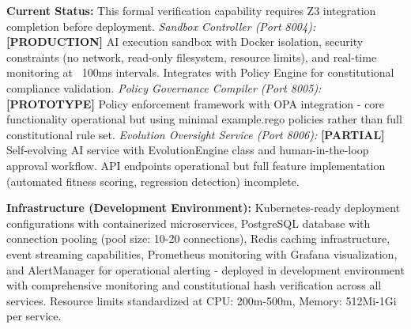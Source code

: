 \documentclass[manuscript,screen,9pt]{acmart}
\begin{document}
\begin{figure*}[!htb]
{\textbf{Current Status:} This formal verification capability requires Z3 integration completion before deployment.
\textit{Sandbox Controller (Port 8004):} \textbf{[PRODUCTION]} AI execution sandbox with Docker isolation, security constraints (no network, read-only filesystem, resource limits), and real-time monitoring at ~100ms intervals. Integrates with Policy Engine for constitutional compliance validation.
\textit{Policy Governance Compiler (Port 8005):} \textbf{[PROTOTYPE]} Policy enforcement framework with OPA integration - core functionality operational but using minimal example.rego policies rather than full constitutional rule set.
\textit{Evolution Oversight Service (Port 8006):} \textbf{[PARTIAL]} Self-evolving AI service with EvolutionEngine class and human-in-the-loop approval workflow. API endpoints operational but full feature implementation (automated fitness scoring, regression detection) incomplete.

\textbf{Infrastructure (Development Environment):}
Kubernetes-ready deployment configurations with containerized microservices, PostgreSQL database with connection pooling (pool size: 10-20 connections), Redis caching infrastructure, event streaming capabilities, Prometheus monitoring with Grafana visualization, and AlertManager for operational alerting - deployed in development environment with comprehensive monitoring and constitutional hash verification across all services. Resource limits standardized at CPU: 200m-500m, Memory: 512Mi-1Gi per service.%
}
\label{fig:architecture}
\end{figure*}
\end{document}
